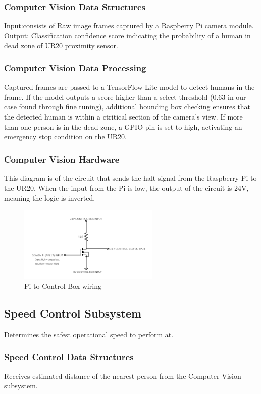 \subsubsection{Computer Vision Data Structures}
Input:consists of Raw image frames captured by a Raspberry Pi camera module.
Output: Classification confidence score indicating the probability of a human in dead zone of UR20 proximity sensor.

\subsubsection{Computer Vision Data Processing}
Captured frames are passed to a TensorFlow Lite model to detect humans in the frame. If the model outputs a score higher than a select threshold (0.63 in our case found through fine tuning), additional bounding box checking ensures that the detected human is within a ctritical section of the camera's view. 
If more than one person is in the dead zone, a GPIO pin is set to high, activating an emergency stop condition on the UR20.

\subsubsection{Computer Vision Hardware}
This diagram is of the circuit that sends the halt signal from the Raspberry Pi to the UR20. When the input from the Pi is low, the output of the circuit is 24V, meaning the logic is inverted.
\begin{figure}[h!]
	\centering
 	\includegraphics[width=0.60\textwidth]{images/piCircuit.png}
 \caption{Pi to Control Box wiring}
\end{figure}

\subsection{Speed Control Subsystem}
Determines the safest operational speed to perform at.

\subsubsection{Speed Control Data Structures}
Receives estimated distance of the nearest person from the Computer Vision subsystem.

